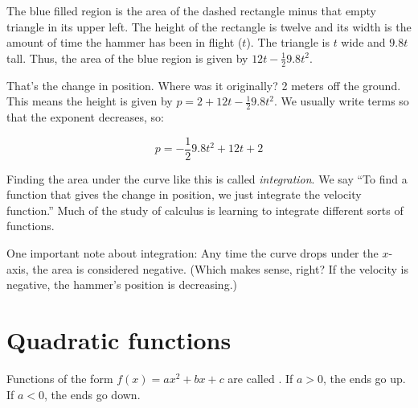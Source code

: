 The blue filled region is the area of the dashed rectangle minus that
empty triangle in its upper left.  The height of the rectangle is
twelve and its width is the amount of time the hammer has been in
flight ($t$). The triangle is $t$ wide and $9.8t$ tall. Thus, the
area of the blue region is given by $12t - \frac{1}{2}9.8 t^2$.

That's the change in position. Where was it originally? 2 meters off
the ground. This means the height is given by $p = 2 + 12t - \frac{1}{2}9.8t^2$.
We usually write terms so that the exponent decreases, so:

$$p = - \frac{1}{2}9.8t^2 + 12t + 2$$

Finding the area under the curve like this is called
\textit{integration}. We say ``To find a function that gives the
change in position, we just integrate the velocity function.''  Much
of the study of calculus is learning to integrate different sorts of
functions.

One important note about integration: Any time the curve drops under
the $x$-axis, the area is considered negative. (Which makes sense,
right? If the velocity is negative, the hammer's position is
decreasing.)




\section{Quadratic functions}

Functions of the form $f(x) = a x^2 + b x + c$ are called . 
If $a > 0$, the ends go up.
If $a < 0$, the ends go down.



